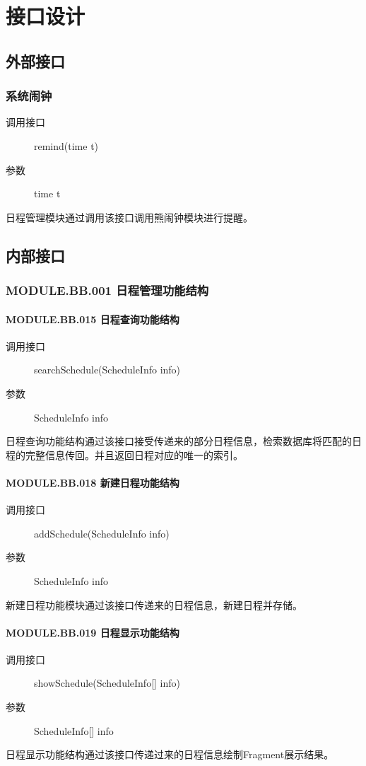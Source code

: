 \chapter{接口设计}
\section{外部接口}
\subsection{系统闹钟}
\begin{description}
  \item[调用接口]remind(time t)
  \item[参数]time t
\end{description}
日程管理模块通过调用该接口调用熊闹钟模块进行提醒。

\section{内部接口}
\subsection{MODULE.BB.001 日程管理功能结构}
  \subsubsection{MODULE.BB.015 日程查询功能结构}
  \begin{description}
    \item[调用接口]searchSchedule(ScheduleInfo info)
    \item[参数]ScheduleInfo info
  \end{description}
  日程查询功能结构通过该接口接受传递来的部分日程信息，检索数据库将匹配的日程的完整信息传回。并且返回日程对应的唯一的索引。
  \subsubsection{MODULE.BB.018 新建日程功能结构}
  \begin{description}
    \item[调用接口]addSchedule(ScheduleInfo info)
    \item[参数]ScheduleInfo info
  \end{description}
  新建日程功能模块通过该接口传递来的日程信息，新建日程并存储。
  \subsubsection{MODULE.BB.019 日程显示功能结构}
  \begin{description}
    \item[调用接口]showSchedule(ScheduleInfo[] info)
    \item[参数]ScheduleInfo[] info
  \end{description}
  日程显示功能结构通过该接口传递过来的日程信息绘制Fragment展示结果。


